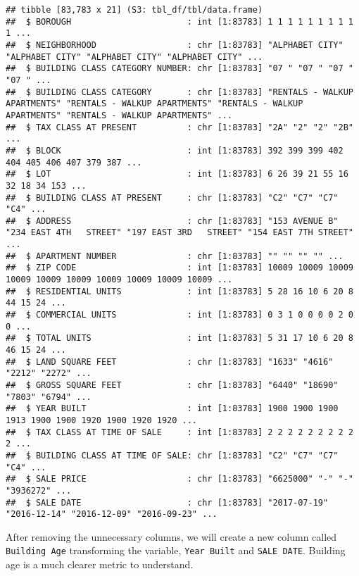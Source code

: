 \documentclass[
  a3paper,
]{article}
\newenvironment{Shaded}{\begin{snugshade}}{\end{snugshade}}
\newcommand{\CommentTok}[1]{\textcolor[rgb]{0.56,0.35,0.01}{\textit{#1}}}
\newcommand{\DataTypeTok}[1]{\textcolor[rgb]{0.13,0.29,0.53}{#1}}
\newcommand{\KeywordTok}[1]{\textcolor[rgb]{0.13,0.29,0.53}{\textbf{#1}}}
\newcommand{\NormalTok}[1]{#1}
\newcommand{\OperatorTok}[1]{\textcolor[rgb]{0.81,0.36,0.00}{\textbf{#1}}}
\newcommand{\StringTok}[1]{\textcolor[rgb]{0.31,0.60,0.02}{#1}}
\begin{document}
\begin{verbatim}
## tibble [83,783 x 21] (S3: tbl_df/tbl/data.frame)
##  $ BOROUGH                       : int [1:83783] 1 1 1 1 1 1 1 1 1 1 ...
##  $ NEIGHBORHOOD                  : chr [1:83783] "ALPHABET CITY" "ALPHABET CITY" "ALPHABET CITY" "ALPHABET CITY" ...
##  $ BUILDING CLASS CATEGORY NUMBER: chr [1:83783] "07 " "07 " "07 " "07 " ...
##  $ BUILDING CLASS CATEGORY       : chr [1:83783] "RENTALS - WALKUP APARTMENTS" "RENTALS - WALKUP APARTMENTS" "RENTALS - WALKUP APARTMENTS" "RENTALS - WALKUP APARTMENTS" ...
##  $ TAX CLASS AT PRESENT          : chr [1:83783] "2A" "2" "2" "2B" ...
##  $ BLOCK                         : int [1:83783] 392 399 399 402 404 405 406 407 379 387 ...
##  $ LOT                           : int [1:83783] 6 26 39 21 55 16 32 18 34 153 ...
##  $ BUILDING CLASS AT PRESENT     : chr [1:83783] "C2" "C7" "C7" "C4" ...
##  $ ADDRESS                       : chr [1:83783] "153 AVENUE B" "234 EAST 4TH   STREET" "197 EAST 3RD   STREET" "154 EAST 7TH STREET" ...
##  $ APARTMENT NUMBER              : chr [1:83783] "" "" "" "" ...
##  $ ZIP CODE                      : int [1:83783] 10009 10009 10009 10009 10009 10009 10009 10009 10009 10009 ...
##  $ RESIDENTIAL UNITS             : int [1:83783] 5 28 16 10 6 20 8 44 15 24 ...
##  $ COMMERCIAL UNITS              : int [1:83783] 0 3 1 0 0 0 0 2 0 0 ...
##  $ TOTAL UNITS                   : int [1:83783] 5 31 17 10 6 20 8 46 15 24 ...
##  $ LAND SQUARE FEET              : chr [1:83783] "1633" "4616" "2212" "2272" ...
##  $ GROSS SQUARE FEET             : chr [1:83783] "6440" "18690" "7803" "6794" ...
##  $ YEAR BUILT                    : int [1:83783] 1900 1900 1900 1913 1900 1900 1920 1900 1920 1920 ...
##  $ TAX CLASS AT TIME OF SALE     : int [1:83783] 2 2 2 2 2 2 2 2 2 2 ...
##  $ BUILDING CLASS AT TIME OF SALE: chr [1:83783] "C2" "C7" "C7" "C4" ...
##  $ SALE PRICE                    : chr [1:83783] "6625000" "-" "-" "3936272" ...
##  $ SALE DATE                     : chr [1:83783] "2017-07-19" "2016-12-14" "2016-12-09" "2016-09-23" ...
\end{verbatim}

After removing the unnecessary columns, we will create a new column
called \texttt{Building\ Age} transforming the variable,
\texttt{Year\ Built} and \texttt{SALE\ DATE}. Building age is a much
clearer metric to understand.

\begin{Shaded}
\end{Shaded}
\end{document}
